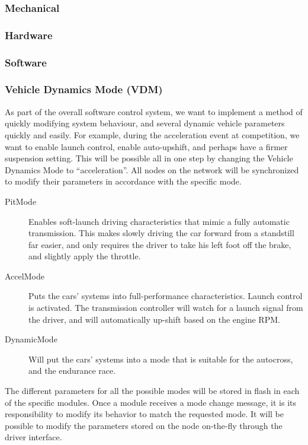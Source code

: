 \subsubsection{Mechanical}
\subsubsection{Hardware}
\subsubsection{Software}

\subsubsection{Vehicle Dynamics Mode (VDM)}

As part of the overall software control system, we want to implement a method of quickly modifying system behaviour, and several dynamic vehicle parameters quickly and easily. For example, during the acceleration event at competition, we want to enable launch control, enable auto-upshift, and perhaps have a firmer suspension setting. This will be possible all in one step by changing the Vehicle Dynamics Mode to {}``acceleration''. All nodes on the network will be synchronized to modify their parameters in accordance with the specific mode.
\begin{description}
  \item [{PitMode}] Enables soft-launch driving characteristics that mimic a fully automatic transmission. This makes slowly driving the car forward from a standstill far easier, and only requires the driver to take his left foot off the brake, and slightly apply the throttle.
  \item [{AccelMode}] Puts the cars' systems into full-performance characteristics. Launch control is activated. The transmission controller will watch for a launch signal from the driver, and will automatically up-shift based on the engine RPM.
  \item [{DynamicMode}] Will put the cars' systems into a mode that is suitable for the autocross, and the endurance race.
\end{description}
The different parameters for all the possible modes will be stored in flash in each of the specific modules. Once a module receives a mode change message, it is its responsibility to modify its behavior to match the requested mode. It will be possible to modify the parameters stored on the node on-the-fly through the driver interface.

